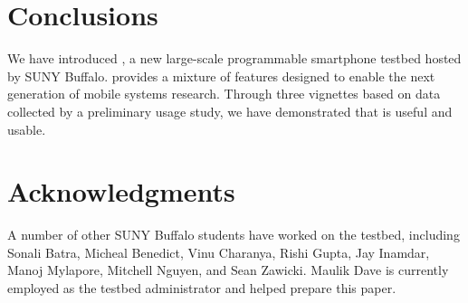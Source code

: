\section{Conclusions}
\label{sec-conclusions}

We have introduced \PhoneLab{}, a new large-scale programmable smartphone
testbed hosted by SUNY Buffalo. \PhoneLab{} provides a mixture of features
designed to enable the next generation of mobile systems research. Through three
vignettes based on data collected by a preliminary usage study, we have
demonstrated that \PhoneLab{} is useful and usable.

\section*{Acknowledgments}

A number of other SUNY Buffalo students have worked on the \PhoneLab{}
testbed, including Sonali Batra, Micheal Benedict, Vinu Charanya, Rishi
Gupta, Jay Inamdar, Manoj Mylapore, Mitchell Nguyen, and Sean Zawicki. Maulik
Dave is currently employed as the testbed administrator and helped prepare
this paper.

